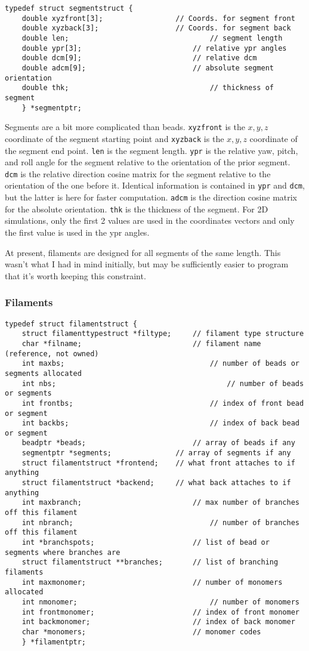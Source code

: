 \documentclass {scrbook}
\newcommand {\ttt} {\texttt}
\begin{document}
\begin{lstlisting}
typedef struct segmentstruct {
	double xyzfront[3];					// Coords. for segment front
	double xyzback[3];					// Coords. for segment back
	double len;									// segment length
	double ypr[3];							// relative ypr angles
	double dcm[9];							// relative dcm
	double adcm[9];							// absolute segment orientation
	double thk;									// thickness of segment
	} *segmentptr;
\end{lstlisting}

Segments are a bit more complicated than beads. \ttt{xyzfront} is the $x,y,z$ coordinate of the segment starting point and \ttt{xyzback} is the $x,y,z$ coordinate of the segment end point. \ttt{len} is the segment length. \ttt{ypr} is the relative yaw, pitch, and roll angle for the segment relative to the orientation of the prior segment. \ttt{dcm} is the relative direction cosine matrix for the segment relative to the orientation of the one before it. Identical information is contained in \ttt{ypr} and \ttt{dcm}, but the latter is here for faster computation. \ttt{adcm} is the direction cosine matrix for the absolute orientation. \ttt{thk} is the thickness of the segment. For 2D simulations, only the first 2 values are used in the coordinates vectors and only the first value is used in the ypr angles.

At present, filaments are designed for all segments of the same length. This wasn't what I had in mind initially, but may be sufficiently easier to program that it's worth keeping this constraint.\\

\subsubsection*{Filaments}

\begin{lstlisting}
typedef struct filamentstruct {
	struct filamenttypestruct *filtype;		// filament type structure
	char *filname;							// filament name (reference, not owned)
	int maxbs;									// number of beads or segments allocated
	int nbs;										// number of beads or segments
	int frontbs;								// index of front bead or segment
	int backbs;									// index of back bead or segment
	beadptr *beads;							// array of beads if any
	segmentptr *segments;				// array of segments if any
	struct filamentstruct *frontend;	// what front attaches to if anything
	struct filamentstruct *backend;		// what back attaches to if anything
	int maxbranch;							// max number of branches off this filament
	int nbranch;								// number of branches off this filament
	int *branchspots;						// list of bead or segments where branches are
	struct filamentstruct **branches;		// list of branching filaments
	int maxmonomer;							// number of monomers allocated
	int nmonomer;								// number of monomers
	int frontmonomer;						// index of front monomer
	int backmonomer;						// index of back monomer
	char *monomers;							// monomer codes
	} *filamentptr;
\end{lstlisting}
\end{document}
